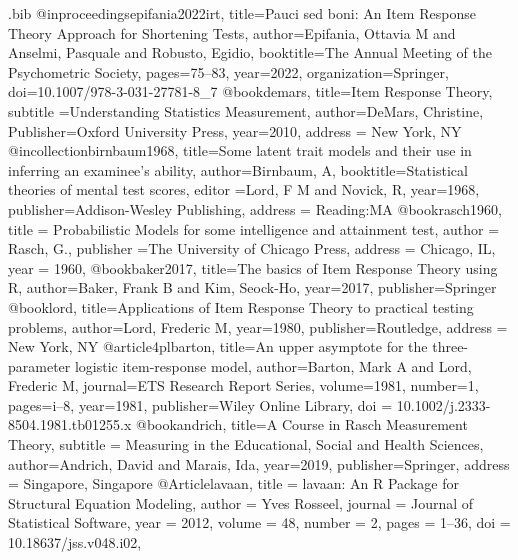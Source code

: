 \RequirePackage{filecontents}
\begin{filecontents*}{\jobname.bib}
@inproceedings{epifania2022irt,
  title={Pauci sed boni: An Item Response Theory Approach for Shortening Tests},
  author={Epifania, Ottavia M and Anselmi, Pasquale and Robusto, Egidio},
  booktitle={The Annual Meeting of the Psychometric Society},
  pages={75--83},
  year={2022},
  organization={Springer}, 
  doi={10.1007/978-3-031-27781-8\_7}
}
@book{demars,
  title={Item Response Theory},
subtitle ={Understanding Statistics Measurement},
  author={DeMars, Christine},
  Publisher={Oxford University Press},
  year={2010},
  address =  {New York, NY}
}
@incollection{birnbaum1968,
  title={Some latent trait models and their use in inferring an examinee's ability},
  author={Birnbaum, A},
  booktitle={Statistical theories of mental test scores},
  editor ={Lord, F M and Novick, R},
  year={1968},
  publisher={Addison-Wesley Publishing}, 
  address = {Reading:MA}
}
@book{rasch1960,
  title = {Probabilistic Models for some intelligence and attainment test},
  author = {Rasch, G.},
   publisher ={The University of Chicago Press},
  address = {Chicago, IL},
  year = {1960},
}
  @book{baker2017,
  title={{The basics of Item Response Theory using R}},
  author={Baker, Frank B and Kim, Seock-Ho},
  year={2017},
  publisher={Springer}
}
@book{lord,
  title={{Applications of Item Response Theory to practical testing problems}},
  author={Lord, Frederic M},
  year={1980},
  publisher={Routledge}, 
  address = {New York, NY}
}
@article{4plbarton,
  title={An upper asymptote for the three-parameter logistic item-response model},
  author={Barton, Mark A and Lord, Frederic M},
  journal={ETS Research Report Series},
  volume={1981},
  number={1},
  pages={i--8},
  year={1981},
  publisher={Wiley Online Library}, 
  doi = {10.1002/j.2333-8504.1981.tb01255.x}
}
@book{andrich,
  title={{A Course in Rasch Measurement Theory}},
  subtitle = {{Measuring in the Educational, Social and Health Sciences}},
  author={Andrich, David and Marais, Ida},
  year={2019},
  publisher={Springer}, 
  address = {Singapore, Singapore}
}
  @Article{lavaan,
    title = {{lavaan}: An {R} Package for Structural Equation Modeling},
    author = {Yves Rosseel},
    journal = {Journal of Statistical Software},
    year = {2012},
    volume = {48},
    number = {2},
    pages = {1--36},
    doi = {10.18637/jss.v048.i02},
  }
  

\end{filecontents*}
